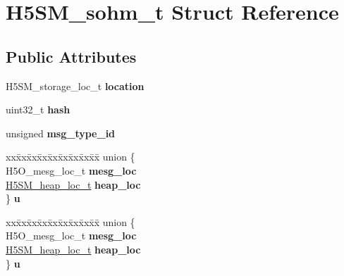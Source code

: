 \hypertarget{struct_h5_s_m__sohm__t}{}\section{H5\+S\+M\+\_\+sohm\+\_\+t Struct Reference}
\label{struct_h5_s_m__sohm__t}
\subsection*{Public Attributes}
\begin{DoxyCompactItemize}
\item 
\mbox{\label{struct_h5_s_m__sohm__t_a582a42267b3b4ca55f4069a9c2fc49aa}} 
H5\+S\+M\+\_\+storage\+\_\+loc\+\_\+t {\bfseries location}
\item 
\mbox{\label{struct_h5_s_m__sohm__t_ae36754f6446eb04052f52d16de925583}} 
uint32\+\_\+t {\bfseries hash}
\item 
\mbox{\label{struct_h5_s_m__sohm__t_a6738eb819dca53c93445dd1b0192063a}} 
unsigned {\bfseries msg\+\_\+type\+\_\+id}
\item 
\mbox{\label{struct_h5_s_m__sohm__t_a8f45f6cd452d9ce630f3dac5a8753b1e}} 
\begin{tabbing}
xx\=xx\=xx\=xx\=xx\=xx\=xx\=xx\=xx\=\kill
union \{\\
\>H5O\_mesg\_loc\_t {\bfseries mesg\_loc}\\
\>\hyperlink{struct_h5_s_m__heap__loc__t}{H5SM\_heap\_loc\_t} {\bfseries heap\_loc}\\
\} {\bfseries u}\\

\end{tabbing}\item 
\mbox{\label{struct_h5_s_m__sohm__t_a340e30cd51c5bfcc11dd25c7ebe79cb7}} 
\begin{tabbing}
xx\=xx\=xx\=xx\=xx\=xx\=xx\=xx\=xx\=\kill
union \{\\
\>H5O\_mesg\_loc\_t {\bfseries mesg\_loc}\\
\>\hyperlink{struct_h5_s_m__heap__loc__t}{H5SM\_heap\_loc\_t} {\bfseries heap\_loc}\\
\} {\bfseries u}\\

\end{tabbing}\end{DoxyCompactItemize}


